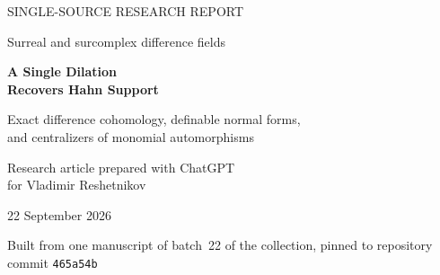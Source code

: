 \documentclass[11pt,oneside]{article}
\numberwithin{equation}{section}
\theoremstyle{definition}
\theoremstyle{remark}
\newcommand{\kk}{\mathbf k}
\begin{document}
\hypersetup{pageanchor=false}
\begin{titlepage}
\vspace*{4mm}
{\color{Ink}\large SINGLE-SOURCE RESEARCH REPORT\par}
\vspace{2mm}
{\color{Ink}\small Surreal and surcomplex difference fields\par}
\vspace{9mm}
{\color{Ink}\Huge\bfseries A Single Dilation\\[4pt] Recovers Hahn Support\par}
\vspace{8mm}
{\Large Exact difference cohomology, definable normal forms,\\
 and centralizers of monomial automorphisms\par}
\vspace{9mm}
{\large Research article prepared with ChatGPT\\
 for Vladimir Reshetnikov\par}
\vspace{3mm}
{22 September 2026\par}
\vspace{1mm}
{\small Built from one manuscript of batch~22 of the collection,
pinned to repository commit \texttt{465a54b}\par}
\vspace{8mm}
\begin{abstract}
Let $K=\kk((t^\Gamma))$ be a full Hahn field of characteristic zero.
We construct a strong, valuation-nondecreasing partial inverse of
$\sigma-\lambda$ for every coefficient-fixing monomial automorphism
$\sigma(t^g)=\chi(g)t^{\theta g}$. The only obstructions occur at exponents
fixed by $\theta$ on which $\chi$ equals $\lambda$. For finitely many commuting
such automorphisms, these inverses give an explicit deformation retraction
of the entire Koszul complex onto its joint-resonant coefficients. This
computes all additive cohomology groups and the principal-unit part of
multiplicative cohomology, and gives exact criteria for simultaneous
multiplicative equations.


\end{abstract}
\end{titlepage}
\end{document}
